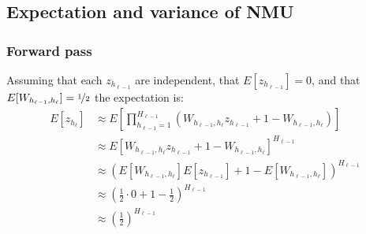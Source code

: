 \subsection{Expectation and variance of NMU}
\label{sec:appendix:moments:nmu}
\subsubsection{Forward pass}
Assuming that each $z_{h_{\ell-1}}$ are independent, that $E[z_{h_{\ell-1}}] = 0$, and that $E[W_{h_{\ell-1},h_\ell}] = \nicefrac{1}{2}$ the expectation is:
\begin{equation}
\begin{aligned}
E[z_{h_\ell}] &\approx E\left[\prod_{h_{\ell-1}=1}^{H_{\ell-1}} \left(W_{h_{\ell-1},h_\ell} z_{h_{\ell-1}} + 1 - W_{h_{\ell-1},h_\ell} \right)\right] \\
&\approx E\left[W_{h_{\ell-1},h_\ell} z_{h_{\ell-1}} + 1 - W_{h_{\ell-1},h_\ell} \right]^{H_{\ell-1}} \\
&\approx \left(E[W_{h_{\ell-1},h_\ell}] E[z_{h_{\ell-1}}] + 1 - E[W_{h_{\ell-1},h_\ell}] \right)^{H_{\ell-1}} \\
&\approx\left(\frac{1}{2}\cdot0 + 1 - \frac{1}{2}\right)^{H_{\ell-1}} \\
&\approx\left(\frac{1}{2}\right)^{H_{\ell-1}}
\end{aligned}
\end{equation}

